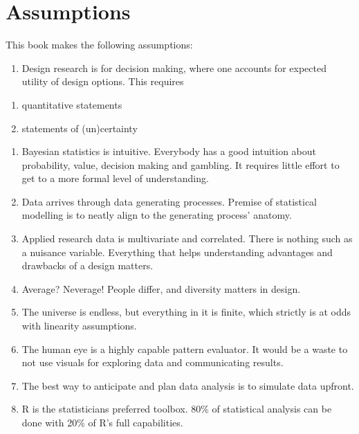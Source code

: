 \documentclass[]{svmono}
\providecommand{\tightlist}{%
  \setlength{\itemsep}{0pt}\setlength{\parskip}{0pt}}
\begin{document}
\section{Assumptions}\label{assumptions}

This book makes the following assumptions:

\begin{enumerate}
\def\labelenumi{\arabic{enumi}.}
\tightlist
\item
  Design research is for decision making, where one accounts for
  expected utility of design options. This requires
\end{enumerate}

\begin{enumerate}
\def\labelenumi{\alph{enumi}.}
\tightlist
\item
  quantitative statements
\item
  statements of (un)certainty
\end{enumerate}

\begin{enumerate}
\def\labelenumi{\arabic{enumi}.}
\setcounter{enumi}{1}
\tightlist
\item
  Bayesian statistics is intuitive. Everybody has a good intuition about
  probability, value, decision making and gambling. It requires little
  effort to get to a more formal level of understanding.
\item
  Data arrives through data generating processes. Premise of statistical
  modelling is to neatly align to the generating process' anatomy.
\item
  Applied research data is multivariate and correlated. There is nothing
  such as a nuisance variable. Everything that helps understanding
  advantages and drawbacks of a design matters.
\item
  Average? Neverage! People differ, and diversity matters in design.
\item
  The universe is endless, but everything in it is finite, which
  strictly is at odds with linearity assumptions.
\item
  The human eye is a highly capable pattern evaluator. It would be a
  waste to not use visuals for exploring data and communicating results.
\item
  The best way to anticipate and plan data analysis is to simulate data
  upfront.
\item
  R is the statisticians preferred toolbox. 80\% of statistical analysis
  can be done with 20\% of R's full capabilities.
\end{enumerate}
\end{document}
